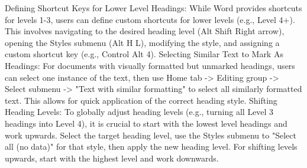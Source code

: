 Defining Shortcut Keys for Lower Level Headings: While Word provides shortcuts for levels 1-3, users can define custom shortcuts for lower levels (e.g., Level 4+). This involves navigating to the desired heading level (Alt Shift Right arrow), opening the Styles submenu (Alt H L), modifying the style, and assigning a custom shortcut key (e.g., Control Alt 4).\supercite{kingsbury2025}
Selecting Similar Text to Mark As Headings: For documents with visually formatted but unmarked headings, users can select one instance of the text, then use Home tab -\textgreater{} Editing group -\textgreater{} Select submenu -\textgreater{} "Text with similar formatting" to select all similarly formatted text. This allows for quick application of the correct heading style.\supercite{kingsbury2025}
Shifting Heading Levels: To globally adjust heading levels (e.g., turning all Level 3 headings into Level 4), it is crucial to start with the lowest level headings and work upwards. Select the target heading level, use the Styles submenu to "Select all (no data)" for that style, then apply the new heading level. For shifting levels upwards, start with the highest level and work downwards.\supercite{kingsbury2025}
